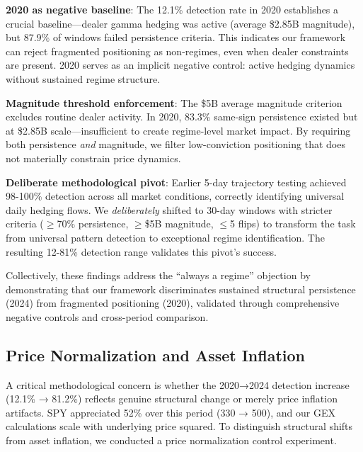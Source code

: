 \textbf{2020 as negative baseline}: The 12.1\% detection rate in 2020 establishes a crucial baseline—dealer gamma hedging was active (average \$2.85B magnitude), but 87.9\% of windows failed persistence criteria. This indicates our framework can reject fragmented positioning as non-regimes, even when dealer constraints are present. 2020 serves as an implicit negative control: active hedging dynamics without sustained regime structure.

\textbf{Magnitude threshold enforcement}: The \$5B average magnitude criterion excludes routine dealer activity. In 2020, 83.3\% same-sign persistence existed but at \$2.85B scale—insufficient to create regime-level market impact. By requiring both persistence \textit{and} magnitude, we filter low-conviction positioning that does not materially constrain price dynamics.

\textbf{Deliberate methodological pivot}: Earlier 5-day trajectory testing achieved 98-100\% detection across all market conditions, correctly identifying universal daily hedging flows. We \textit{deliberately} shifted to 30-day windows with stricter criteria ($\geq$70\% persistence, $\geq$\$5B magnitude, $\leq$5 flips) to transform the task from universal pattern detection to exceptional regime identification. The resulting 12-81\% detection range validates this pivot's success.

Collectively, these findings address the ``always a regime'' objection by demonstrating that our framework discriminates sustained structural persistence (2024) from fragmented positioning (2020), validated through comprehensive negative controls and cross-period comparison.

\subsection{Price Normalization and Asset Inflation}

\vspace{0.2cm}

A critical methodological concern is whether the 2020→2024 detection increase (12.1\% → 81.2\%) reflects genuine structural change or merely price inflation artifacts. SPY appreciated 52\% over this period (330 → 500), and our GEX calculations scale with underlying price squared. To distinguish structural shifts from asset inflation, we conducted a price normalization control experiment.

\vspace{0.2cm}

